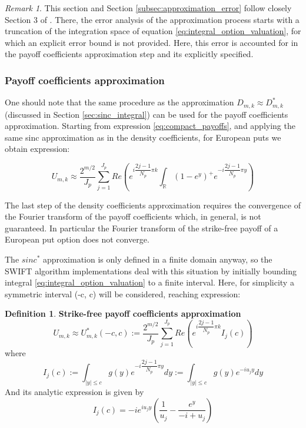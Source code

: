 \documentclass[12,twoside]{mammeTFM}
\theoremstyle{definition}
\newtheorem{definition}[thm]{Definition}
\theoremstyle{remark}
\newtheorem{remark}[thm]{Remark}
\newcommand{\R}{\ensuremath{\mathbb{R}}}
\begin{document}
\begin{remark}
This section and Section \ref{subsec:approximation_error} follow closely Section 3 of \cite{mar17}. There, the error analysis of the approximation process starts with a truncation of the integration space of equation  \ref{eq:integral_option_valuation}, for which an explicit error bound is not provided. Here, this error is accounted for in the payoff coefficients approximation step and its explicitly specified.
\end{remark}

\subsubsection{Payoff coefficients approximation} \label{subsec:payoff_coefficients}
One should note that the same procedure as the approximation $D_{m,k} \approx D_{m,k}^{*}$ (discussed in Section \ref{sec:sinc_integral}) can be used for the payoff coefficients approximation. Starting from expression \ref{eq:compact_payoffs}, and applying the same sinc approximation as in the density coefficients, for European puts we obtain expression:

\begin{equation}
U_{m,k} \approx \dfrac{2^{m/2}}{J_p}\sum_{j=1}^{J_p} Re \left( e^{i \dfrac{2j - 1}{N_p} \pi k} \int_{\R} (1 - e^y)^{+} e^{-i \dfrac{2j - 1}{N_p} \pi y} \right)
\end{equation}

The last step of the density coefficients approximation requires the convergence of the Fourier transform of the payoff coefficients which, in general, is not guaranteed. In particular the Fourier transform of the strike-free payoff of a European put option does not converge.

The $sinc^{*}$ approximation is only defined in a finite domain anyway, so the SWIFT algorithm implementations deal with this situation by initially bounding integral \ref{eq:integral_option_valuation} to a finite interval. Here, for simplicity a symmetric interval (-c, c) will be considered, reaching expression:

\begin{definition} \textbf{Strike-free payoff coefficients approximation}
\begin{equation}
U_{m,k} \approx U_{m,k}^{*}(-c, c) := \dfrac{2^{m/2}}{J_p}\sum_{j=1}^{J_p} Re \left(e^{i \dfrac{2j - 1}{N_p} \pi k} I_{j}(c)\right)
\end{equation}
where
\begin{equation} \label{eq:strike_free_int}
I_{j}(c) := \int_{|y| \leq c} g(y) e^{-i \dfrac{2j - 1}{N_p} \pi y} dy := \int_{|y| \leq c} g(y) e^{-i u_j y} dy
\end{equation}
And its analytic expression is given by
\begin{equation}
I_{j}(c) = -i e^{i u_j y} \left(\dfrac{1}{u_j} - \dfrac{e^y}{-i + u_j}\right)
\end{equation}
\end{definition}
\end{document}
